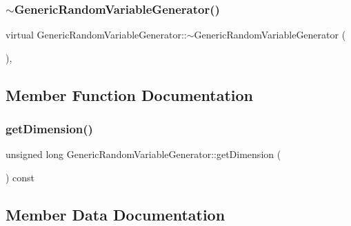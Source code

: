 \hypertarget{class_generic_random_variable_generator_a5a95e8b9b2432f2cbbf1f7b32773d036}{}\label{class_generic_random_variable_generator_a5a95e8b9b2432f2cbbf1f7b32773d036} 
\subsubsection{\texorpdfstring{$\sim$\+Generic\+Random\+Variable\+Generator()}{~GenericRandomVariableGenerator()}}
{\footnotesize\ttfamily virtual Generic\+Random\+Variable\+Generator\+::$\sim$\+Generic\+Random\+Variable\+Generator (\begin{DoxyParamCaption}{ }\end{DoxyParamCaption})\hspace{0.3cm}{\ttfamily [inline]}, {\ttfamily [virtual]}}



\subsection{Member Function Documentation}
\hypertarget{class_generic_random_variable_generator_aaca8d2c084b88a58ee0825f60361caa5}{}\label{class_generic_random_variable_generator_aaca8d2c084b88a58ee0825f60361caa5} 
\subsubsection{\texorpdfstring{get\+Dimension()}{getDimension()}}
{\footnotesize\ttfamily unsigned long Generic\+Random\+Variable\+Generator\+::get\+Dimension (\begin{DoxyParamCaption}{ }\end{DoxyParamCaption}) const\hspace{0.3cm}{\ttfamily [inline]}}



\subsection{Member Data Documentation}
\hypertarget{class_generic_random_variable_generator_aec0118677502f71bbb4ad07c6b8e95be}{}\label{class_generic_random_variable_generator_aec0118677502f71bbb4ad07c6b8e95be} 
